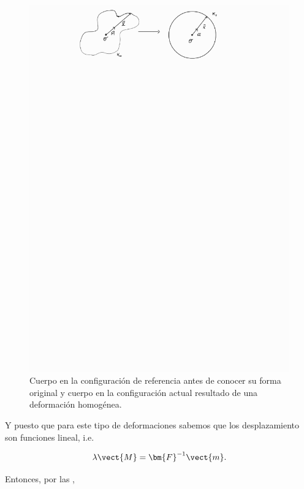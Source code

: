 \documentclass[../main.tex]{subfiles}
\begin{document}
\begin{problema}[3]
	\begin{figure}[htb]
		\centering
		\includegraphics[scale=0.7, trim={4cm 25cm 5.2cm 0cm}, clip]{figs/problema02.pdf}
		\caption{Cuerpo en la configuración de referencia antes de conocer su forma original y cuerpo
			en la configuración actual resultado de una deformación homogénea.}
	\end{figure}

	Y puesto que para este tipo de deformaciones sabemos que los desplazamiento son
	funciones lineal, i.e.

	\begin{equation}
		\lambda \vect{M} = \bm{F}^{-1}\vect{m}.
		\label{eq:deformation_lineal}
	\end{equation}

	Entonces, por las ,


\end{problema}
\end{document}
